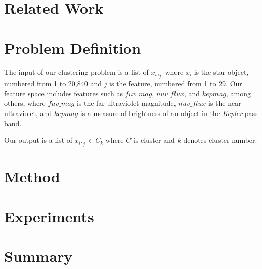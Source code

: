 \documentclass[12pt]{article}
\begin{document}

\section{Related Work} %
\label{sec:Related Work}


\section{Problem Definition} %
\label{sec:Problem Definition}


The input of our clustering problem is a list of $x_i,_j$ where $x_i$ is the star object, numbered from 1 to 20,840 and $j$ is the feature, numbered from 1 to 29.
Our feature space includes features such as $fuv\_mag$, $nuv\_flux$, and $kepmag$, among others, where $fuv\_mag$ is the far ultraviolet magnitude, $nuv\_flux$ is the near ultraviolet, and $kepmag$ is a measure of brightness of an object in the \textit{Kepler} pass band.

Our output is a list of $x_i,_j \in C_k$ where $C$ is cluster and $k$ denotes cluster number. 



\section{Method} %
\label{sec:Method}


\section{Experiments} %
\label{sec:Experiments}


\section{Summary} %
\label{sec:Summary}





\end{document}

